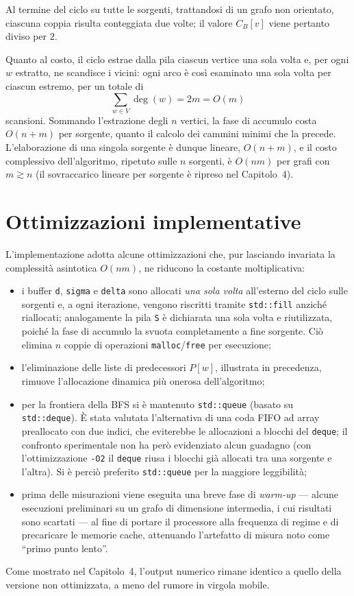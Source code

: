 \documentclass[11pt,a4paper]{report}
\begin{document}
Al termine del ciclo su tutte le sorgenti, trattandosi di un grafo non
orientato, ciascuna coppia risulta conteggiata due volte; il valore $C_B[v]$
viene pertanto diviso per $2$.

Quanto al costo, il ciclo estrae dalla pila ciascun vertice una sola volta e, per
ogni $w$ estratto, ne scandisce i vicini: ogni arco è così esaminato una sola volta
per ciascun estremo, per un totale di
\[
	\sum_{w\in V}\deg(w) = 2m = O(m)
\]
scansioni. Sommando l'estrazione degli $n$ vertici, la fase di accumulo costa
$O(n+m)$ per sorgente, quanto il calcolo dei cammini minimi che la precede.
L'elaborazione di una singola sorgente è dunque lineare, $O(n+m)$, e il costo
complessivo dell'algoritmo, ripetuto sulle $n$ sorgenti, è $O(nm)$ per grafi con
$m\gtrsim n$ (il sovraccarico lineare per sorgente è ripreso nel Capitolo~4).

\section{Ottimizzazioni implementative}

L'implementazione adotta alcune ottimizzazioni che, pur lasciando invariata la
complessità asintotica $O(nm)$, ne riducono la costante moltiplicativa:
\begin{itemize}
	\item i buffer \texttt{d}, \texttt{sigma} e \texttt{delta}
	      sono allocati \emph{una sola volta} all'esterno del ciclo sulle sorgenti
	      e, a ogni iterazione, vengono riscritti tramite \texttt{std::fill}
	      anziché riallocati; analogamente la pila \texttt{S} è dichiarata una sola
	      volta e riutilizzata, poiché la fase di accumulo la svuota completamente
	      a fine sorgente. Ciò elimina $n$ coppie di operazioni
	      \texttt{malloc}/\texttt{free} per esecuzione;
	\item l'eliminazione delle liste di predecessori $P[w]$, illustrata in
	      precedenza, rimuove l'allocazione dinamica più onerosa dell'algoritmo;
	\item per la frontiera della BFS si è mantenuto
	      \texttt{std::queue} (basato su \texttt{std::deque}). È stata valutata
	      l'alternativa di una coda FIFO ad array preallocato con due indici, che
	      eviterebbe le allocazioni a blocchi del \texttt{deque}; il confronto
	      sperimentale non ha però evidenziato alcun guadagno (con
	      l'ottimizzazione \texttt{-O2} il \texttt{deque} riusa i blocchi già
	      allocati tra una sorgente e l'altra). Si è perciò preferito
	      \texttt{std::queue} per la maggiore leggibilità;
	\item prima delle misurazioni viene eseguita una breve fase di
	      \emph{warm-up} --- alcune esecuzioni preliminari su un grafo di dimensione
	      intermedia, i cui risultati sono scartati --- al fine di portare il
	      processore alla frequenza di regime e di precaricare le memorie cache,
	      attenuando l'artefatto di misura noto come ``primo punto lento''.
\end{itemize}
Come mostrato nel Capitolo~4, l'output numerico rimane identico a quello della
versione non ottimizzata, a meno del rumore in virgola mobile.
\end{document}

